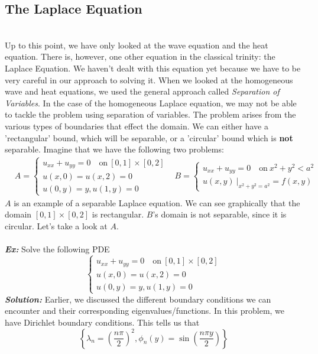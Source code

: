 \documentclass{article}
\begin{document}
\subsection{The Laplace Equation}
\noindent \\
\indent Up to this point, we have only looked at the wave equation and the heat equation. There is, however, one other equation in the classical trinity: the Laplace Equation. We haven't dealt with this equation yet because we have to be very careful in our approach to solving it. When we looked at the homogeneous wave and heat equations, we used the general approach called \textit{Separation of Variables}. In the case of the homogeneous Laplace equation, we may not be able to tackle the problem using separation of variables. The problem arises from the various types of boundaries that effect the domain. We can either have a 'rectangular' bound, which will be separable, or a 'circular' bound which is \textbf{not} separable. Imagine that we have the following two problems:
\begin{align*}
&A =\begin{cases}
u_{xx} + u_{yy} = 0\quad \text{on}\ [0,1]\times[0,2]\\
u(x,0) = u(x,2) = 0\\
u(0,y) = y, u(1,y) = 0
\end{cases}
&B =\begin{cases}
u_{xx} + u_{yy} = 0\quad \text{on}\ x^{2} + y^{2} < a^{2}\\
u(x,y)\ \big |_{x^{2} + y^{2} = a^{2}} = f(x,y)
\end{cases}
\end{align*}
$A$ is an example of a separable Laplace equation. We can see graphically that the domain $[0,1] \times [0,2]$ is rectangular. $B$'s domain is not separable, since it is circular. Let's take a look at $A$.\\\\
\noindent \textbf{\textit{Ex:}} Solve the following PDE
\[
\begin{cases*}
u_{xx} + u_{yy} = 0\quad \text{on}\ [0,1]\times[0,2]\\
u(x,0) = u(x,2) = 0\\
u(0,y) = y, u(1,y) = 0
\end{cases*}
\]
\indent \textbf{\textit{Solution:}} Earlier, we discussed the different boundary conditions we can encounter and their corresponding eigenvalues/functions. In this problem, we have Dirichlet boundary conditions. This tells us that
\[
\left\{\lambda_{n} = \left(\frac{n\pi}{2}\right)^{2}, \phi_{n}(y) = \sin{\left(\frac{n\pi y}{2}\right)}\right\}
\]
\end{document}
